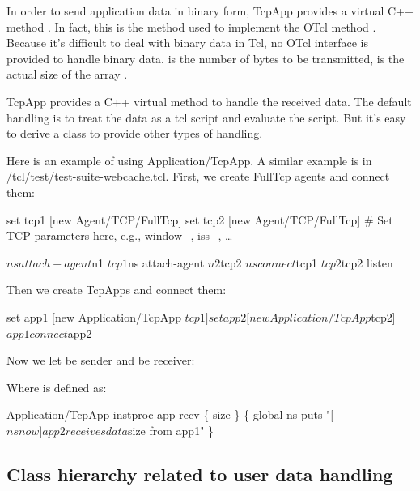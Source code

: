 In order to send application data in binary form, TcpApp provides a 
virtual C++ method .
In fact, this is the method used to implement the OTcl method .
Because it's difficult to deal with binary data in Tcl, no OTcl interface
is provided to handle binary data.  is the number of bytes 
to be transmitted,  is the actual size of the array .

TcpApp provides a C++ virtual method 
to handle the received data. The default handling is to treat the data 
as a tcl script and evaluate the script. But it's easy to derive a class
to provide other types of handling.

Here is an example of using Application/TcpApp. A similar example is 
 in \ns/tcl/test/test-suite-webcache.tcl.
First, we create FullTcp agents and connect them:

\begin{program}
        set tcp1 [new Agent/TCP/FullTcp]
        set tcp2 [new Agent/TCP/FullTcp]
        # {\cf Set TCP parameters here, e.g., window_, iss_, \ldots}

        $ns attach-agent $n1 $tcp1
        $ns attach-agent $n2 $tcp2
        $ns connect $tcp1 $tcp2
        $tcp2 listen
\end{program}

Then we create TcpApps and connect them:

\begin{program}
        set app1 [new Application/TcpApp $tcp1]
        set app2 [new Application/TcpApp $tcp2]
        $app1 connect $app2
\end{program}

Now we let  %
be sender and  %
be receiver:


Where  is defined as:

\begin{program}
        Application/TcpApp instproc app-recv \{ size \} \{
                global ns
                puts "[$ns now] app2 receives data $size from app1"
        \}
\end{program}

\subsection{Class hierarchy related to user data handling}

